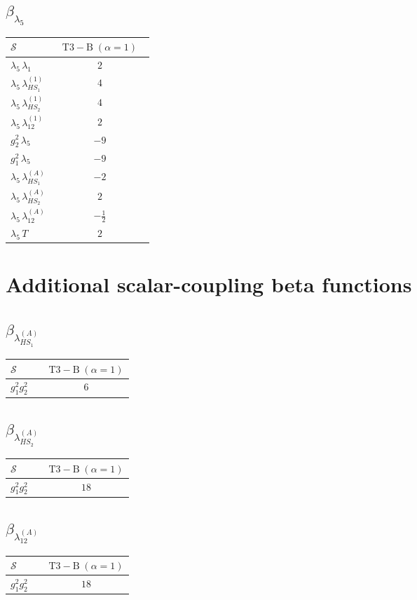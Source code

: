 \documentclass[9pt]{article}
\begin{document}
\subsection*{$ \beta_{\lambda_5} $}
\begin{longtable}{@{}p{0.31\linewidth}c@{}}
\toprule
$\mathcal{S}$ & $ \mathrm{T3-B}\;(\alpha=1) $ \\
\midrule
$ \lambda_5\,\lambda_1 $ & $ 2 $ \\
$ \lambda_5\,\lambda_{HS_1}^{(1)} $ & $ 4 $ \\
$ \lambda_5\,\lambda_{HS_2}^{(1)} $ & $ 4 $ \\
$ \lambda_5\,\lambda_{12}^{(1)} $ & $ 2 $ \\
$ g_2^2\,\lambda_5 $ & $ -9 $ \\
$ g_1^2\,\lambda_5 $ & $ -9 $ \\
$ \lambda_5\,\lambda_{HS_1}^{(A)} $ & $ -2 $ \\
$ \lambda_5\,\lambda_{HS_2}^{(A)} $ & $ 2 $ \\
$ \lambda_5\,\lambda_{12}^{(A)} $ & $ - \frac{1}{2} $ \\
$ \lambda_5\,T $ & $ 2 $ \\
\bottomrule
\end{longtable}
\section*{Additional scalar-coupling beta functions}
\subsection*{$ \beta_{\lambda_{HS_1}^{(A)}} $}
\begin{longtable}{@{}p{0.31\linewidth}c@{}}
\toprule
$\mathcal{S}$ & $ \mathrm{T3-B}\;(\alpha=1) $ \\
\midrule
$ g_1^2g_2^2 $ & $ 6 $ \\
\bottomrule
\end{longtable}
\subsection*{$ \beta_{\lambda_{HS_2}^{(A)}} $}
\begin{longtable}{@{}p{0.31\linewidth}c@{}}
\toprule
$\mathcal{S}$ & $ \mathrm{T3-B}\;(\alpha=1) $ \\
\midrule
$ g_1^2g_2^2 $ & $ 18 $ \\
\bottomrule
\end{longtable}
\subsection*{$ \beta_{\lambda_{12}^{(A)}} $}
\begin{longtable}{@{}p{0.31\linewidth}c@{}}
\toprule
$\mathcal{S}$ & $ \mathrm{T3-B}\;(\alpha=1) $ \\
\midrule
$ g_1^2g_2^2 $ & $ 18 $ \\
\bottomrule
\end{longtable}
\end{document}
